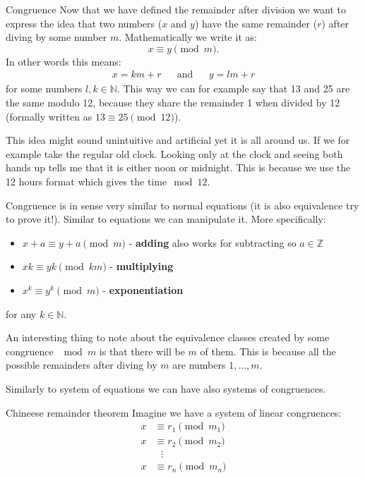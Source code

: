 \documentclass[final]{beamer}
\newlength{\colwidth}
\newcommand{\N}{\mathbb{N}}
\begin{document}
\begin{frame}[t]
\begin{columns}[t]
\begin{column}{\colwidth}
\begin{block}{Congruence}
 Now that we have defined the remainder after division we want to express the
 idea that two numbers ($x$ and $y$) have the same remainder ($r$) after diving by some number $m$.
 Mathematically we write it as:
 \[
  x \equiv y \pmod{m}.
 \]
 In other words this means:
 \begin{align*}
  x = km + r && \text{and}  && y = lm + r
 \end{align*}
 for some numbers $l,k \in \N$. This way we can for example say that 13 and 25
 are the same modulo 12, because they share the remainder 1 when divided by 12
 (formally written as  $13 \equiv 25 \pmod{12}$).

 This idea might sound unintuitive and artificial yet it is all around us. If we
 for example take the regular old clock. Looking only at the clock and seeing
 both hands up tells me that it is either noon or midnight. This is because we
 use the 12 hours format which gives the time$ \mod  12$.

Congruence is in sense very similar to normal equations (it is also
equivalence try to prove it!). Similar to equations we can manipulate it.
More specifically:
\begin{itemize}[label=\textbullet,left=24pt]
 \item $x+a \equiv y+a \pmod{m}$ - \textbf{adding} also works for subtracting so
  $a \in \mathbb{Z}$
 \item $xk \equiv yk \pmod{km}$ - \textbf{multiplying}
 \item $x^k \equiv y^k \pmod{m}$ - \textbf{exponentiation}
\end{itemize}
for any $k \in \N$.

An interesting thing to note about the equivalence classes created by some
congruence $\mod m$ is that there will be $m$ of them. This is because all the
possible remainders after diving by $m$ are numbers $1, \ldots, m$. 

Similarly to system of equations we can have also systems of congruences.

\end{block}  
\begin{alertblock}{Chineese remainder theorem}
 Imagine we have a system of linear congruences:
   \begin{equation*}
   \begin{split}
    x & \equiv r_1 \pmod{m_1}\\
    x & \equiv r_2 \pmod{m_2}\\
      &~~~\vdots\\
    x & \equiv r_n \pmod{m_n}
   \end{split}
  \end{equation*}


\end{alertblock}
\end{column}
\end{columns}
\end{frame}
\end{document}
